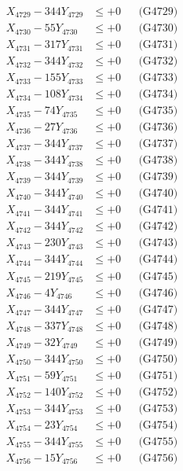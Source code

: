 \documentclass[a4paper,10pt]{article}
\begin{document}
{\begin{align}
X_{4729} - 344Y_{4729} &\leq +0 && \text{(G4729)} \\
X_{4730} - 55Y_{4730} &\leq +0 && \text{(G4730)} \\
\allowbreak
X_{4731} - 317Y_{4731} &\leq +0 && \text{(G4731)} \\
X_{4732} - 344Y_{4732} &\leq +0 && \text{(G4732)} \\
X_{4733} - 155Y_{4733} &\leq +0 && \text{(G4733)} \\
X_{4734} - 108Y_{4734} &\leq +0 && \text{(G4734)} \\
X_{4735} - 74Y_{4735} &\leq +0 && \text{(G4735)} \\
X_{4736} - 27Y_{4736} &\leq +0 && \text{(G4736)} \\
X_{4737} - 344Y_{4737} &\leq +0 && \text{(G4737)} \\
X_{4738} - 344Y_{4738} &\leq +0 && \text{(G4738)} \\
X_{4739} - 344Y_{4739} &\leq +0 && \text{(G4739)} \\
X_{4740} - 344Y_{4740} &\leq +0 && \text{(G4740)} \\
\allowbreak
X_{4741} - 344Y_{4741} &\leq +0 && \text{(G4741)} \\
X_{4742} - 344Y_{4742} &\leq +0 && \text{(G4742)} \\
X_{4743} - 230Y_{4743} &\leq +0 && \text{(G4743)} \\
X_{4744} - 344Y_{4744} &\leq +0 && \text{(G4744)} \\
X_{4745} - 219Y_{4745} &\leq +0 && \text{(G4745)} \\
X_{4746} - 4Y_{4746} &\leq +0 && \text{(G4746)} \\
X_{4747} - 344Y_{4747} &\leq +0 && \text{(G4747)} \\
X_{4748} - 337Y_{4748} &\leq +0 && \text{(G4748)} \\
X_{4749} - 32Y_{4749} &\leq +0 && \text{(G4749)} \\
X_{4750} - 344Y_{4750} &\leq +0 && \text{(G4750)} \\
\allowbreak
X_{4751} - 59Y_{4751} &\leq +0 && \text{(G4751)} \\
X_{4752} - 140Y_{4752} &\leq +0 && \text{(G4752)} \\
X_{4753} - 344Y_{4753} &\leq +0 && \text{(G4753)} \\
X_{4754} - 23Y_{4754} &\leq +0 && \text{(G4754)} \\
X_{4755} - 344Y_{4755} &\leq +0 && \text{(G4755)} \\
X_{4756} - 15Y_{4756} &\leq +0 && \text{(G4756)} \\

\end{align}}
\end{document}
